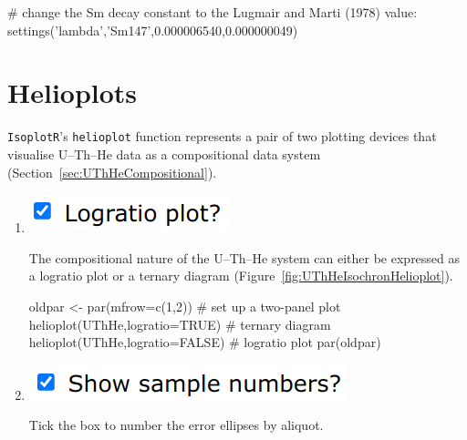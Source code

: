 \begin{refsection}
\begin{script}
# change the Sm decay constant to the Lugmair and Marti (1978) value:
settings('lambda','Sm147',0.000006540,0.000000049)
\end{script}

\section{Helioplots}\label{sec:helioplot-R}

\texttt{IsoplotR}'s \texttt{helioplot} function represents a pair of
two plotting devices that visualise U--Th--He data as a compositional
data system (Section~\ref{sec:UThHeCompositional}).

\begin{enumerate}
  
\item \noindent\begin{minipage}[t]{.18\linewidth}
\strut\vspace*{-\baselineskip}\newline
\includegraphics[width=\linewidth]{../figures/UThHelioplotLogratio.png}
\end{minipage}
\begin{minipage}[t]{.82\linewidth}
  The compositional nature of the U--Th--He system can either be
  expressed as a logratio plot or a ternary diagram
  (Figure~\ref{fig:UThHeIsochronHelioplot}).\\
\end{minipage}

\begin{script}
oldpar <- par(mfrow=c(1,2)) # set up a two-panel plot
helioplot(UThHe,logratio=TRUE)  # ternary diagram
helioplot(UThHe,logratio=FALSE) # logratio plot
par(oldpar)
\end{script}

\item \noindent\begin{minipage}[t]{.28\linewidth}
\strut\vspace*{-\baselineskip}\newline
\includegraphics[width=\linewidth]{../figures/UThHeshownumbers.png}
\end{minipage}
\begin{minipage}[t]{.72\linewidth}
Tick the box to number the error ellipses by aliquot.\\
\end{minipage}


\end{enumerate}
\end{refsection}
